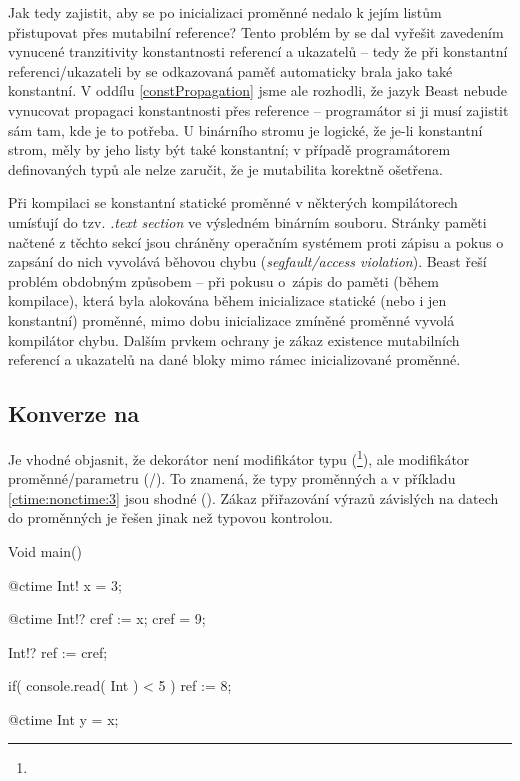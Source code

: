 Jak tedy zajistit, aby se po inicializaci proměnné  nedalo k jejím listům přistupovat přes mutabilní reference? Tento problém by se dal vyřešit zavedením vynucené tranzitivity konstantnosti referencí a ukazatelů -- tedy že při konstantní referenci/ukazateli by se odkazovaná paměť automaticky brala jako také konstantní. V oddílu \ref{constPropagation} jsme ale rozhodli, že jazyk Beast nebude vynucovat propagaci konstantnosti přes reference -- programátor si ji musí zajistit sám tam, kde je to potřeba. U binárního stromu je logické, že je-li konstantní strom, měly by jeho listy být také konstantní; v případě programátorem definovaných typů ale nelze zaručit, že je mutabilita korektně ošetřena.

Při kompilaci se konstantní statické proměnné v některých kompilátorech umísťují do tzv. \textit{.text section} ve výsledném binárním souboru. Stránky paměti načtené z těchto sekcí jsou chráněny operačním systémem proti zápisu a pokus o zapsání do nich vyvolává běhovou chybu (\textit{segfault/access violation}). Beast řeší problém obdobným způsobem -- při pokusu o~zápis do paměti (během kompilace), která byla alokována během inicializace statické \ctime (nebo i jen konstantní) proměnné, mimo dobu inicializace zmíněné proměnné vyvolá kompilátor chybu. Dalším prvkem ochrany je zákaz existence mutabilních referencí a ukazatelů na dané bloky mimo rámec inicializované proměnné.

\subsection{Konverze na \nonctime}
Je vhodné objasnit, že dekorátor  není modifikátor typu (\footnote{}), ale modifikátor proměnné/parametru (/). To znamená, že typy proměnných  a  v příkladu \ref{ctime:nonctime:3} jsou shodné (). Zákaz přiřazování výrazů závislých na \nonctime datech do \ctime proměnných je řešen jinak než typovou kontrolou.

\begin{code}[\label{ctime:nonctime:3}]
Void main() {
	@ctime Int! x = 3;
	
	@ctime Int!? cref := x;
	cref = 9; $\label{ctime:nonctime:1}$
	
	Int!? ref := cref; $\label{ctime:nonctime:2}$
	
	if( console.read( Int ) < 5 )
		ref := 8;
		
	@ctime Int y = x;
}
\end{code}

